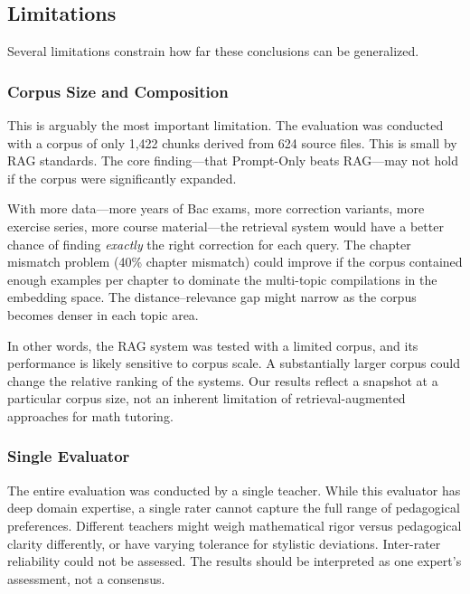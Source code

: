 \subsection{Limitations}
\label{subsec:limitations}

Several limitations constrain how far these conclusions can be generalized.

\subsubsection{Corpus Size and Composition}
\label{subsec:lim-corpus}

This is arguably the most important limitation. The evaluation was conducted
with a corpus of only 1{,}422 chunks derived from 624 source files. This is
small by RAG standards. The core finding—that Prompt-Only beats RAG—may
not hold if the corpus were significantly expanded.

With more data—more years of Bac exams, more correction variants, more
exercise series, more course material—the retrieval system would have a
better chance of finding \textit{exactly} the right correction for each
query. The chapter mismatch problem (40\% chapter mismatch) could
improve if the corpus contained enough examples per chapter to dominate the
multi-topic compilations in the embedding space. The distance--relevance gap
might narrow as the corpus becomes denser in each topic area.

In other words, the RAG system was tested with a limited corpus, and its
performance is likely sensitive to corpus scale. A substantially larger
corpus could change the relative ranking of the systems. Our results reflect
a snapshot at a particular corpus size, not an inherent limitation of
retrieval-augmented approaches for math tutoring.

\subsubsection{Single Evaluator}

The entire evaluation was conducted by a single teacher. While this
evaluator has deep domain expertise, a single rater cannot capture the full
range of pedagogical preferences. Different teachers might weigh
mathematical rigor versus pedagogical clarity differently, or have varying
tolerance for stylistic deviations. Inter-rater reliability could not be
assessed. The results should be interpreted as one expert's assessment, not
a consensus.

